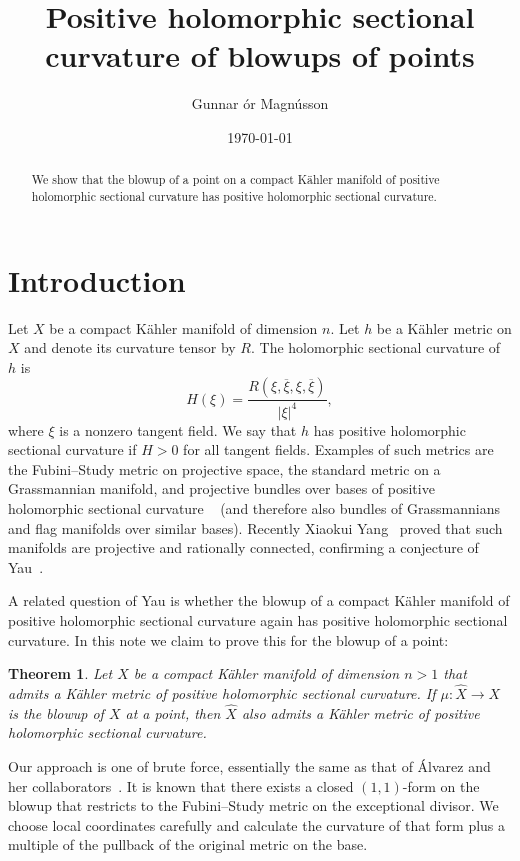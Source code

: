 \documentclass[10pt,a4paper]{amsart}
\author{Gunnar \TH\'or Magn\'usson}
\date{\today}
\title[Positive holomorphic sectional curvature of blowups of points]
{Positive holomorphic sectional\\curvature of blowups of points}
\newtheorem*{maintheo}{Theorem}
\def\ov#1{\overline{#1}}
\def\hsc{holomorphic sectional curvature}
\def\bl#1{\widehat{#1}}
\def\blX{\bl{X}}
\begin{document}
\begin{abstract}
We show that the blowup of a point on a compact K\"ahler manifold of positive
holomorphic sectional curvature has positive holomorphic sectional curvature.
\end{abstract}

\maketitle


\section*{Introduction}

Let $X$ be a compact K\"ahler manifold of dimension $n$.
Let $h$ be a K\"ahler metric on $X$ and denote its curvature tensor by $R$.
The holomorphic sectional curvature of $h$ is
$$
H(\xi)
= \frac{R(\xi, \ov\xi, \xi, \ov\xi)}{|\xi|^4},
$$
where $\xi$ is a nonzero tangent field.
We say that $h$ has positive holomorphic sectional curvature if $H > 0$ for all
tangent fields.
Examples of such metrics are the Fubini--Study metric on projective space,
the standard metric on a Grassmannian manifold,
and projective bundles over bases of positive holomorphic sectional curvature
~\cite{alvarez2018projectivized}
(and therefore also bundles of Grassmannians and flag manifolds over similar
bases).
Recently Xiaokui Yang~\cite{yang2017rc} proved that such manifolds are
projective and rationally connected, confirming a conjecture of
Yau~\cite{yau1993open}.

A related question of Yau is whether the blowup of a compact K\"ahler manifold
of positive \hsc{} again has positive \hsc.
In this note we claim to prove this for the blowup of a point:

\begin{maintheo}
Let $X$ be a compact K\"ahler manifold of dimension $n > 1$ that admits a
K\"ahler metric of positive \hsc.
If $\mu : \blX \to X$ is the blowup of $X$ at a point, then $\blX$ also admits
a K\"ahler metric of positive \hsc.
\end{maintheo}

Our approach is one of brute force, essentially the same as that of \'Alvarez
and her collaborators~\cite{alvarez2018projectivized}. It is known that there
exists a closed $(1,1)$-form on the blowup that restricts to the Fubini--Study
metric on the exceptional divisor. We choose local coordinates carefully and
calculate the curvature of that form plus a multiple of the pullback of the
original metric on the base.
\end{document}
